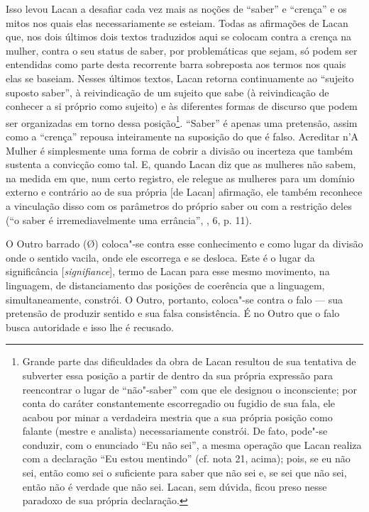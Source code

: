 Isso levou Lacan a desafiar cada vez mais as noções de ``saber'' e
``crença'' e os mitos nos quais elas necessariamente se esteiam. Todas
as afirmações de Lacan que, nos dois últimos dois textos traduzidos aqui
se colocam contra a crença na mulher, contra o seu status de saber, por
problemáticas que sejam, só podem ser entendidas como parte desta
recorrente barra sobreposta aos termos nos quais elas se baseiam. Nesses
últimos textos, Lacan retorna continuamente ao ``sujeito suposto
saber'', à reivindicação de um sujeito que sabe (à reivindicação de
conhecer a si próprio como sujeito) e às diferentes formas de discurso
que podem ser organizadas em torno dessa posição\footnote{Grande parte
  das dificuldades da obra de Lacan resultou de sua tentativa de
  subverter essa posição a partir de dentro da sua própria expressão
  para reencontrar o lugar de ``não"-saber'' com que ele designou o
  inconsciente; por conta do caráter constantemente escorregadio ou
  fugidio de sua fala, ele acabou por minar a verdadeira mestria que a
  sua própria posição como falante (mestre e analista) necessariamente
  constrói. De fato, pode"-se conduzir, com o enunciado ``Eu não sei'', a
  mesma operação que Lacan realiza com a declaração ``Eu estou
  mentindo'' (cf. nota 21, acima); pois, se eu não sei, então como sei o
  suficiente para saber que não sei e, se sei que não sei, então não é
  verdade que não sei. Lacan, sem dúvida, ficou preso nesse paradoxo de
  sua própria declaração.}. ``Saber'' é apenas uma pretensão, assim como
a ``crença'' repousa inteiramente na suposição do que é falso. Acreditar
n'A Mulher é simplesmente uma forma de cobrir a divisão ou incerteza que
também sustenta a convicção como tal. E, quando Lacan diz que as
mulheres não sabem, na medida em que, num certo registro, ele relegue as
mulheres para um domínio externo e contrário ao de sua própria {[}de
Lacan{]} afirmação, ele também reconhece a vinculação disso com os
parâmetros do próprio saber ou com a restrição deles (``o saber é
irremediavelmente uma errância'', , 6, p. 11).

O Outro barrado (Ø) coloca"-se contra esse conhecimento e como lugar da
divisão onde o sentido vacila, onde ele escorrega e se desloca. Este é o
lugar da significância {[}\emph{signifiance}{]}, termo de Lacan para
esse mesmo movimento, na linguagem, de distanciamento das posições de
coerência que a linguagem, simultaneamente, constrói. O Outro, portanto,
coloca"-se contra o falo --- sua pretensão de produzir sentido e sua falsa
consistência. É no Outro que o falo busca autoridade e isso lhe é
recusado.

